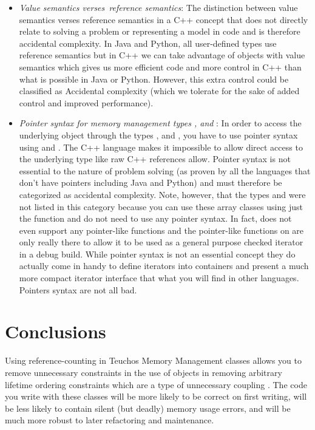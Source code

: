 \documentclass[pdf,ps2pdf,11pt]{SANDreport}
\begin{document}
\begin{itemize}

{}\item\textit{Value semantics verses\ reference semantics}: The
distinction between value semantics verses reference semantics in a
C++ concept that does not directly relate to solving a problem or
representing a model in code and is therefore accidental complexity.
In Java and Python, all user-defined types use reference semantics but
in C++ we can take advantage of objects with value semantics which
gives us more efficient code and more control in C++ than what is
possible in Java or Python.  However, this extra control could be
classified as Accidental complexity (which we tolerate for the sake
of added control and improved performance).

{}\item\textit{Pointer syntax for memory management types
{}, and {}}: In order to access the underlying
object through the types {}, and {}, you have
to use pointer syntax using {} and
{}.  The C++ language makes it impossible to
allow direct access to the underlying type like raw C++ references
allow.  Pointer syntax is not essential to the nature of problem
solving (as proven by all the languages that don't have pointers
including Java and Python) and must therefore be categorized as
accidental complexity.  Note, however, that the types
{} and {} were not listed in this
category because you can use these array classes using just the
{} function and do not need to use any
pointer syntax.  In fact, {} does not even support
any pointer-like functions and the pointer-like functions on
{} are only really there to allow it to be used as a
general purpose checked iterator in a debug build.  While pointer
syntax is not an essential concept they do actually come in handy to
define iterators into containers and present a much more compact
iterator interface that what you will find in other languages.
Pointers syntax are not all bad.

\end{itemize}

%
{}\section{Conclusions}
\label{sec:conclusions}
%

Using reference-counting in Teuchos Memory Management classes allows
you to remove unnecessary constraints in the use of objects in
removing arbitrary lifetime ordering constraints which are a type of
unnecessary coupling {}\cite{CodeComplete2nd04}.  The code you write
with these classes will be more likely to be correct on first writing,
will be less likely to contain silent (but deadly) memory usage
errors, and will be much more robust to later refactoring and
maintenance.
\end{document}
